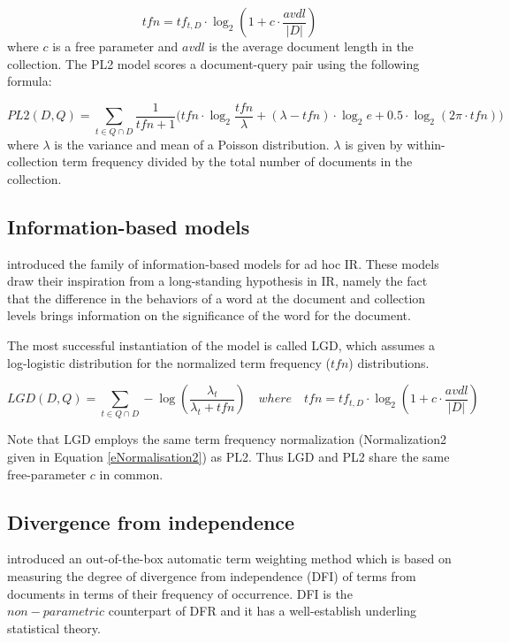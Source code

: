 \begin{equation}\label{eNormalisation2}
tfn = tf_{t,D} \cdot \log_2 (1 + c \cdot \frac{avdl}{|D|})
\end{equation}
where $c$ is a free parameter and $avdl$ is the average document length in the collection.
The PL2 model scores a document-query pair using the following formula:

\begin{equation}\label{pl2}
PL2(D, Q)=\sum_{t \in Q \cap D} \frac{1}{tfn+1}\big(tfn\cdot\log_2\frac{tfn}{\lambda}+(\lambda-tfn)\cdot\log_2e+0.5\cdot\log_2(2\pi\cdot tfn)\big)
\end{equation}
where $\lambda$ is the variance and mean of a Poisson distribution.
$\lambda$ is given by within-collection term frequency divided by the total number of documents in the collection.

\subsection{Information-based models}
\citet*{lgd09,lgd10,lgd11} introduced the family of information-based models for ad hoc IR. 
These models draw their inspiration from a long-standing hypothesis in IR, namely the fact that the difference in the behaviors of a word at the document and collection levels brings information on the significance of the word for the document. 

The most successful instantiation of the model is called LGD, which assumes a log-logistic distribution for the normalized term frequency ($tfn$) distributions.

\begin{equation}\label{lgd}
LGD(D, Q)=\sum_{t \in Q \cap D} -\log (\frac{\lambda_t}{\lambda_t+tfn}) \quad where \quad tfn = tf_{t,D} \cdot \log_2 (1 + c \cdot \frac{avdl}{|D|})
\end{equation}

Note that LGD employs the same term frequency normalization (Normalization2 given in Equation \ref{eNormalisation2}) as PL2.
Thus LGD and PL2 share the same free-parameter $c$ in common.

\subsection{Divergence from independence}
\citet*{dfi} introduced an out-of-the-box automatic term weighting method which is based on measuring the degree of divergence from independence (DFI) of terms from documents in terms of their frequency of occurrence. 
DFI is the $non-parametric$ counterpart of DFR and it has a well-establish underling statistical theory.

